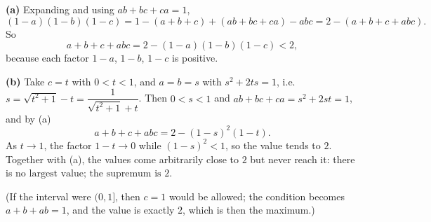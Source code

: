 \textbf{(a)} Expanding and using $ab+bc+ca=1$,
\[(1-a)(1-b)(1-c)=1-(a+b+c)+(ab+bc+ca)-abc=2-(a+b+c+abc).\]
So
\[a+b+c+abc=2-(1-a)(1-b)(1-c)<2,\]
because each factor $1-a$, $1-b$, $1-c$ is positive.

\textbf{(b)} Take $c=t$ with $0<t<1$, and $a=b=s$ with $s^2+2ts=1$, i.e. $s=\sqrt{t^2+1}-t=\dfrac{1}{\sqrt{t^2+1}+t}$. Then $0<s<1$ and $ab+bc+ca=s^2+2st=1$, and by (a)
\[a+b+c+abc=2-(1-s)^2(1-t).\]
As $t\to1$, the factor $1-t\to0$ while $(1-s)^2<1$, so the value tends to $2$. Together with (a), the values come arbitrarily close to $2$ but never reach it: there is $\boxed{\text{no largest value; the supremum is }2}$.

(If the interval were $(0,1]$, then $c=1$ would be allowed; the condition becomes $a+b+ab=1$, and the value is exactly $2$, which is then the maximum.)
